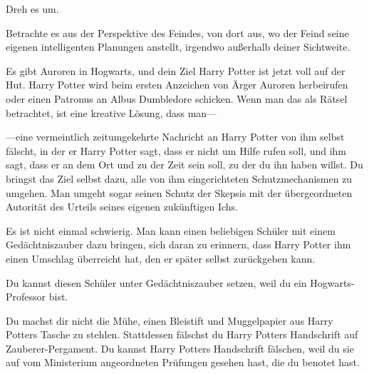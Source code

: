 Dreh es um.

Betrachte es aus der Perspektive des Feindes, von dort aus, wo der Feind seine eigenen intelligenten Planungen anstellt, irgendwo außerhalb deiner Sichtweite.

Es gibt Auroren in Hogwarts, und dein Ziel Harry Potter ist jetzt voll auf der Hut. Harry Potter wird beim ersten Anzeichen von Ärger Auroren herbeirufen oder einen Patronus an Albus Dumbledore schicken. Wenn man das als Rätsel betrachtet, ist eine kreative Lösung, dass man—

—eine vermeintlich zeitumgekehrte Nachricht an Harry Potter von ihm selbst fälscht, in der er Harry Potter sagt, dass er nicht um Hilfe rufen soll, und ihm sagt, dass er an dem Ort und zu der Zeit sein soll, zu der du ihn haben willst. Du bringst das Ziel selbst dazu, alle von ihm eingerichteten Schutzmechanismen zu umgehen. Man umgeht sogar seinen Schutz der Skepsis mit der übergeordneten Autorität des Urteils seines eigenen zukünftigen Ichs.

Es ist nicht einmal schwierig. Man kann einen beliebigen Schüler mit einem Gedächtniszauber dazu bringen, sich daran zu erinnern, dass Harry Potter ihm einen Umschlag überreicht hat, den er später selbst zurückgeben kann.

Du kannst diesen Schüler unter Gedächtniszauber setzen, weil du ein Hogwarts-Professor bist.

Du machst dir nicht die Mühe, einen Bleistift und Muggelpapier aus Harry Potters Tasche zu stehlen. Stattdessen fälschst du Harry Potters Handschrift auf Zauberer-Pergament.
Du kannst Harry Potters Handschrift fälschen, weil du sie auf vom Ministerium angeordneten Prüfungen gesehen hast, die du benotet hast.

